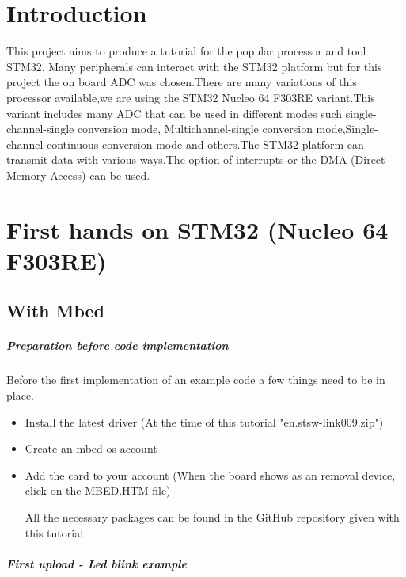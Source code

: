 \documentclass[a4paper, 11pt, openany, oneside, english]{book}
\begin{document}
\frontmatter
\umonsCoverPage
\tableofcontents
\newpage

\mainmatter
{}
\chapter*{Introduction}
This project aims to produce a tutorial for the popular  processor and tool STM32. Many peripherals can interact with the STM32 platform but for this project the on board ADC was chosen.There are many variations of this  processor  available,we are using the STM32 Nucleo 64 F303RE variant.This variant includes many ADC that can be used in different modes such single-channel-single conversion mode, Multichannel-single conversion mode,Single-channel continuous conversion mode and others.The STM32 platform can transmit data with various ways.The option of interrupts or the DMA (Direct Memory Access) can be used.


\chapter{First hands on STM32 (Nucleo 64 F303RE)}
\section{With Mbed}
\paragraph{Preparation before code implementation}
Before the first implementation of an example code a few things need to be in place.


\begin{itemize}
  \item Install the latest driver (At the time of this tutorial "en.stsw-link009.zip")
  \item Create an mbed os account
  \item Add the card to your account (When the board shows as an removal device, click on the MBED.HTM file)
  
All the necessary packages can be found in the GitHub repository given with this tutorial
\end{itemize}

\paragraph{First upload - Led blink example }
\end{document}
